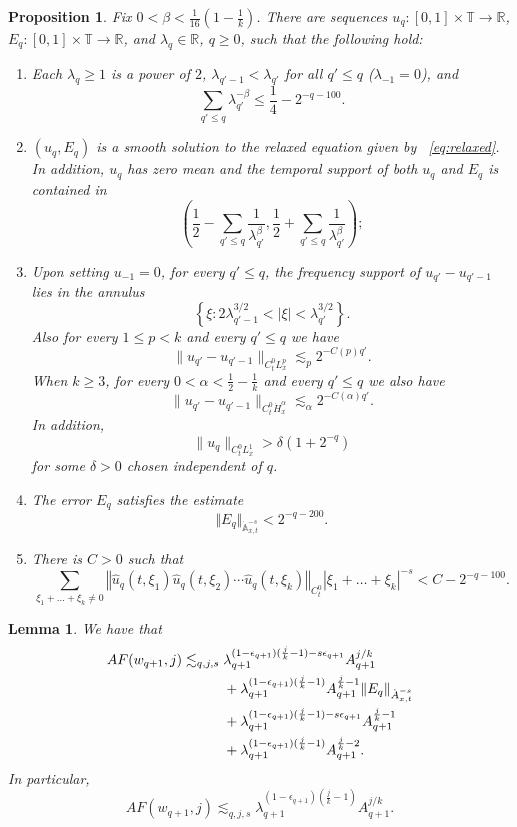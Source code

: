 \documentclass[10pt,a4paper]{amsart}
\newtheorem{proposition}{Proposition}
\newtheorem{lemma}{Lemma}
\newcommand{\A}{\mathbb A}
\newcommand{\R}{\mathbb R}
\newcommand{\T}{\mathbb T}
\newcommand{\norm}[1]{ \Vert #1 \Vert}
\begin{document}
\begin{proposition}\label{prop:ind}
    Fix $0 < \beta < \frac{1}{16}\left(1 - \frac{1}{k}\right)$. There are sequences $u_q:[0,1] \times \T \to \R$, $E_q : [0,1] \times \T \to \R$, and $\lambda_q \in \R$, $q \geq 0$, such that the following hold:
    \begin{enumerate}
        \item\label{i:1} Each $\lambda_q \geq 1$ is a power of $2$, $\lambda_{q'-1} < \lambda_{q'}$ for all $q' \leq q$ ($\lambda_{-1}=0$), and
        $$
        \sum_{q' \leq q}\lambda_{q'}^{-\beta} \leq \frac{1}{4} - 2^{-q-100}.
        $$
        \item\label{i:2} $(u_q,E_q)$ is a smooth solution to the relaxed equation given by ~\eqref{eq:relaxed}. In addition, $u_q$ has zero mean and the temporal support of both $u_q$ and $E_q$ is contained in
        $$
        \left(\frac{1}{2}- \sum_{q'\leq q} \frac{1}{\lambda_{q'}^\beta},\frac{1}{2} + \sum_{q' \leq q} \frac{1}{\lambda_{q'}^\beta}\right);
        $$
        \item\label{i:3} Upon setting $u_{-1}=0$, for every $q' \leq q$, the frequency support of $u_{q'} - u_{q'-1}$ lies in the annulus
        $$
        \left\{\xi : 2\lambda_{q'-1}^{3/2} < |\xi| < \lambda_{q'}^{3/2}\right\}.
        $$
        Also for every $1\le p<k$ and every
$q'\le q$ we have
\[
    \|u_{q'}-u_{q'-1}\|_{C_t^0L_x^p}
    \lesssim_p
    2^{-C(p)q'}.
\]
When $k\ge3$, for every $0<\alpha<\frac12-\frac1k$ and every $q'\le q$ we also
have
\[
    \|u_{q'}-u_{q'-1}\|_{C_t^0\dot H_x^\alpha}
    \lesssim_\alpha
    2^{-C(\alpha)q'}.
\]
In addition,
\[
    \|u_q\|_{C_t^0L_x^1}>\delta(1+2^{-q})
\]
for some $\delta>0$ chosen independent of $q$.
\item\label{i:4} The error $E_q$ satisfies the estimate
        \[
        \norm{E_q}_{\dot{\mathbb{A}}_{x,t}^{-s}} < 2^{-q-200}.
        \]
        \item\label{i:5} There is $C>0$ such that
        $$
        \sum_{\xi_1 + \ldots + \xi_k \not = 0} \left\Vert  \hat{u}_{q}(t,\xi_1) \hat{u}_{q}(t,\xi_2) \cdots \hat{u}_{q}(t,\xi_k) \right\Vert_{C_t^0}|\xi_1 + \ldots + \xi_k|^{-s} < C - 2^{-q-100}.
        $$
    \end{enumerate}
\end{proposition}

\begin{lemma}\label{lem:horrible1}
    We have that
    \[
\begin{aligned}
AF(w_{q+1},j)
\lesssim_{q,j,s}\;&
\lambda_{q+1}^{(1-\epsilon_{q+1})(\frac jk-1)-s\epsilon_{q+1}}
A_{q+1}^{j/k}
\\
&+
\lambda_{q+1}^{(1-\epsilon_{q+1})(\frac jk-1)}
A_{q+1}^{\frac jk-1}
\|E_q\|_{\dot{\mathbb \A}^{-s}_{x, t}}
\\
&+
\lambda_{q+1}^{(1-\epsilon_{q+1})(\frac jk-1)-s\epsilon_{q+1}}
A_{q+1}^{\frac jk-1}
\\
&+
\lambda_{q+1}^{(1-\epsilon_{q+1})(\frac jk-1)}
A_{q+1}^{\frac jk-2}.
\end{aligned}
\]
In particular,
\[
AF(w_{q+1},j)
\lesssim_{q,j,s}
\lambda_{q+1}^{(1-\epsilon_{q+1})(\frac jk-1)}
A_{q+1}^{j/k}.
\]

\end{lemma}
\end{document}
